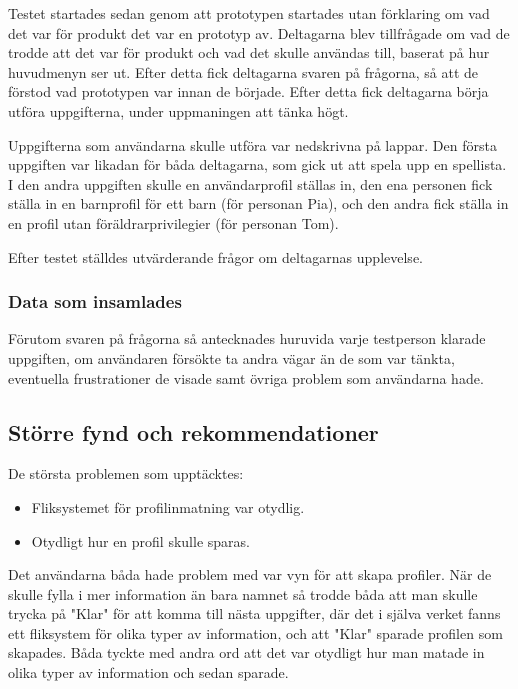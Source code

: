 \documentclass[a4paper,12pt,titlepage]{article}
\begin{document}
Testet startades sedan genom att prototypen startades utan förklaring om vad
det var för produkt det var en prototyp av. Deltagarna blev tillfrågade om vad
de trodde att det var för produkt och vad det skulle användas till,
baserat på hur huvudmenyn ser ut. Efter detta fick deltagarna svaren på
frågorna, så att de förstod vad prototypen var innan de började. Efter detta
fick deltagarna börja utföra uppgifterna, under uppmaningen att tänka högt.

Uppgifterna som användarna skulle utföra var nedskrivna på lappar. Den första
uppgiften var likadan för båda deltagarna, som gick ut att spela upp en
spellista. I den andra uppgiften skulle en användarprofil ställas in, den ena
personen fick ställa in en barnprofil för ett barn (för personan Pia), och den
andra fick ställa in en profil utan föräldrarprivilegier (för personan Tom).

Efter testet ställdes utvärderande frågor om deltagarnas upplevelse.

\subsubsection*{Data som insamlades}

Förutom svaren på frågorna så antecknades huruvida varje testperson klarade
uppgiften, om användaren försökte ta andra vägar än de som var tänkta,
eventuella frustrationer de visade samt övriga problem som användarna hade.

\subsection*{Större fynd och rekommendationer}

De största problemen som upptäcktes:

\begin{itemize}
    \item Fliksystemet för profilinmatning var otydlig.
    \item Otydligt hur en profil skulle sparas.
\end{itemize}

Det användarna båda hade problem med var vyn för att skapa profiler. När de
skulle fylla i mer information än bara namnet så trodde båda att man skulle
trycka på "Klar" för att komma till nästa uppgifter, där det i själva verket
fanns ett fliksystem för olika typer av information, och att "Klar" sparade
profilen som skapades. Båda tyckte med andra ord att det var otydligt hur man
matade in olika typer av information och sedan sparade.
\end{document}
